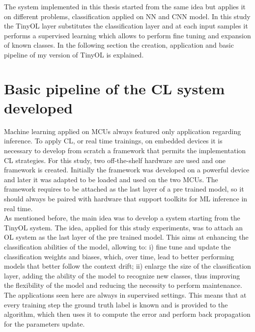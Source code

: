 \documentclass[12pt]{report}
\begin{document}
The system implemented in this thesis started from the same idea but applies it on different problems, classification applied on NN and CNN model. In this study the TinyOL layer substitutes the classification layer and at each input samples it performs a supervised learning which allows to perform fine tuning and expansion of known classes. In the following section the creation, application and basic pipeline of my version of TinyOL is explained. 

\section{Basic pipeline of the CL system developed}
\label{basic_system}
Machine learning applied on MCUs always featured only application regarding inference. To apply CL, or real time trainings, on embedded devices it is necessary to develop from scratch a framework that permits the implementation CL strategies. For this study, two off-the-shelf hardware are used and one framework is created. Initially the framework was developed on a powerful device and later it was adapted to be loaded and used on the two MCUs. The framework requires to be attached as the last layer of a pre trained model, so it should always be paired with hardware that support toolkits for ML inference in real time.\\
As mentioned before, the main idea was to develop a system starting from the TinyOL system. The idea, applied for this study experiments, was to attach an OL system as the last layer of the pre trained model. This aims at enhancing the classification abilities of the model, allowing to: i) fine tune and update the classification weights and biases, which, over time, lead to better performing models that better follow the context drift; ii) enlarge the size of the classification layer, adding the ability of the model to recognize new classes, thus improving the flexibility of the model and reducing the necessity to perform maintenance. The applications seen here are always in supervised settings. This means that at every training step the ground truth label is known and is provided to the algorithm, which then uses it to compute the error and perform back propagation for the parameters update.\\
\end{document}
